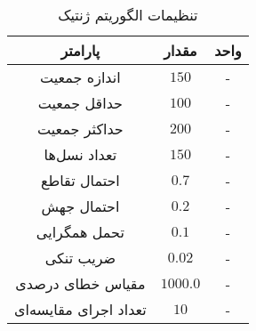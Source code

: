\begin{table}[h!]
\centering
\caption{تنظیمات الگوریتم ژنتیک}
\label{tab:ga_params}
\begin{tabular}{ccc}
\hline
\textbf{پارامتر} & \textbf{مقدار} & \textbf{واحد} \\
\hline
اندازه جمعیت & $150$ & - \\
حداقل جمعیت & $100$ & - \\
حداکثر جمعیت & $200$ & - \\
تعداد نسل‌ها & $150$ & - \\
احتمال تقاطع & $0.7$ & - \\
احتمال جهش & $0.2$ & - \\
تحمل همگرایی & $0.1$ & - \\
ضریب تنکی & $0.02$ & - \\
مقیاس خطای درصدی & $1000.0$ & - \\
تعداد اجرای مقایسه‌ای & $10$ & - \\
\hline
\end{tabular}
\end{table}

